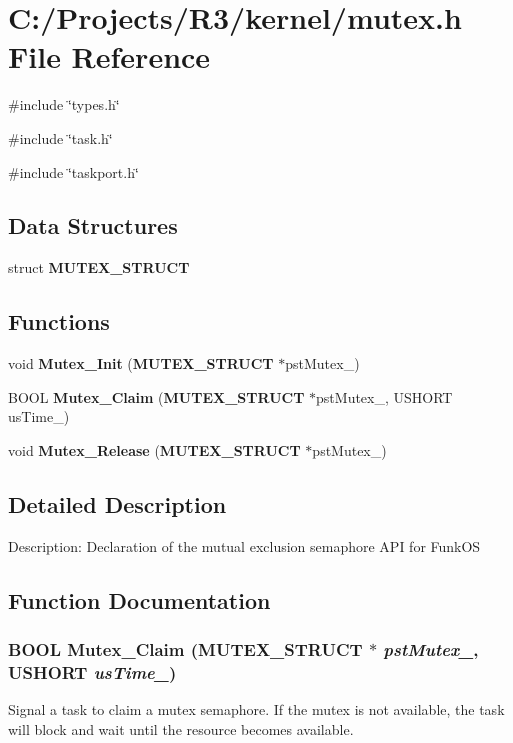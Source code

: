 \section{C:/Projects/R3/kernel/mutex.h File Reference}
\label{mutex_8h}
{\ttfamily \#include \char`\"{}types.h\char`\"{}}\par
{\ttfamily \#include \char`\"{}task.h\char`\"{}}\par
{\ttfamily \#include \char`\"{}taskport.h\char`\"{}}\par
\subsection*{Data Structures}
\begin{DoxyCompactItemize}
\item 
struct {\bf MUTEX\_\-STRUCT}
\end{DoxyCompactItemize}
\subsection*{Functions}
\begin{DoxyCompactItemize}
\item 
void {\bf Mutex\_\-Init} ({\bf MUTEX\_\-STRUCT} $\ast$pstMutex\_\-)
\item 
BOOL {\bf Mutex\_\-Claim} ({\bf MUTEX\_\-STRUCT} $\ast$pstMutex\_\-, USHORT usTime\_\-)
\item 
void {\bf Mutex\_\-Release} ({\bf MUTEX\_\-STRUCT} $\ast$pstMutex\_\-)
\end{DoxyCompactItemize}


\subsection{Detailed Description}
Description: Declaration of the mutual exclusion semaphore API for FunkOS 

\subsection{Function Documentation}
\subsubsection[{Mutex\_\-Claim}]{\setlength{\rightskip}{0pt plus 5cm}BOOL Mutex\_\-Claim ({\bf MUTEX\_\-STRUCT} $\ast$ {\em pstMutex\_\-}, \/  USHORT {\em usTime\_\-})}\label{mutex_8h_a3ceb42d00b59e5e684138917dde4084a}
Signal a task to claim a mutex semaphore. If the mutex is not available, the task will block and wait until the resource becomes available.


